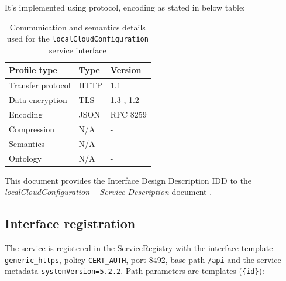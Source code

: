 \documentclass[a4paper]{arrowhead}
\begin{document}
It's implemented using protocol, encoding as stated in below table:
\begin{table}[ht!]
  \centering
  \begin{tabular}{|l|l|l|}
    \hline
    \rowcolor{gray!33} Profile type & Type & Version \\ \hline
    Transfer protocol & HTTP & 1.1 \cite{rfc9112} \\ \hline
    Data encryption & TLS & 1.3 \cite{rfc8446}, 1.2 \cite{rfc5246} \\ \hline
    Encoding & JSON & RFC 8259 \cite{rfc8259} \\ \hline
    Compression & N/A & - \\ \hline
    Semantics & N/A & - \\ \hline
    Ontology & N/A & - \\ \hline
  \end{tabular}
  \caption{Communication and semantics details used for the \texttt{local\allowbreak{}Cloud\allowbreak{}Configuration} service interface}
  \label{tab:comunication_semantics_profile}
\end{table}

This document provides the Interface Design Description IDD to the \textit{localCloudConfiguration -- Service Description} document \cite{lcc-localCloudConfiguration-sd}.

\subsection{Interface registration}

The service is registered in the ServiceRegistry with the interface template \texttt{generic\_\allowbreak{}https}, policy \texttt{CERT\_\allowbreak{}AUTH}, port 8492, base path \texttt{/\allowbreak{}api} and the service metadata \texttt{systemVersion=5.2.2}. Path parameters are templates (\texttt{\{id\}}):
\end{document}
